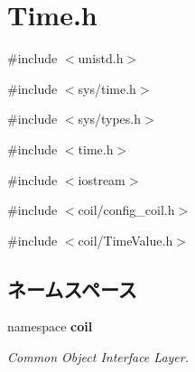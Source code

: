 \section{Time.h}
\label{Time_8h}
{\ttfamily \#include $<$unistd.h$>$}\par
{\ttfamily \#include $<$sys/time.h$>$}\par
{\ttfamily \#include $<$sys/types.h$>$}\par
{\ttfamily \#include $<$time.h$>$}\par
{\ttfamily \#include $<$iostream$>$}\par
{\ttfamily \#include $<$coil/config\_\-coil.h$>$}\par
{\ttfamily \#include $<$coil/TimeValue.h$>$}\par
\subsection*{ネームスペース}
\begin{DoxyCompactItemize}
\item 
namespace {\bf coil}


\begin{DoxyCompactList}\small\item\em Common Object Interface Layer. \item\end{DoxyCompactList}

\end{DoxyCompactItemize}
